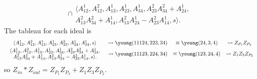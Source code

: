 \documentclass{article} %
\begin{document}
\begin{example}
\[\cap \begin{array}{c}
     \langle A_{12}^1, A_{12}^2, A_{13}^1, A_{23}^1, A_{34}^1, A_{23}^2A_{34}^2 + A_{24}^1,  \\
     A_{13}^2A_{34}^2 + A_{14}^1, A_{13}^2A_{24}^1 - A_{23}^2A_{14}^1, s \rangle. 
\end{array} 
\]
The tableau for each ideal is
\[\begin{array}{cccc}\vspace{1mm}
    \langle A_{12}^1, A_{12}^2, A_{13}^1, A_{23}^1, A_{23}^2, A_{24}^1, A_{34}^1,s \rangle &\leadsto \young(11124,223,34) &\equiv \young(24,3,4) &\leadsto Z_{P_1} Z_{P_3} \\ 
    \begin{array}{c}
     \langle A_{12}^1, A_{12}^2, A_{13}^1, A_{23}^1, A_{34}^1, A_{23}^2A_{34}^2 + A_{24}^1,  \\
     A_{13}^2A_{34}^2 + A_{14}^1, A_{13}^2A_{24}^1 - A_{23}^2A_{14}^1, s \rangle. 
\end{array} &\leadsto \young(11123,224,34) &\equiv \young(123,24,4) &\leadsto Z_1 Z_3 Z_{P_2}
\end{array}
\]
so $Z_{in} * Z_{out} = Z_{P_1} Z_{P_3} + Z_1 Z_3 Z_{P_2}$.
\end{example}



\end{document}
